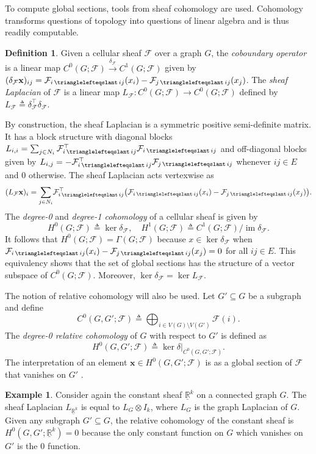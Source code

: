 \documentclass[letterpaper, 10 pt, conference]{ieeeconf}
\newcommand{\maps}{\colon}
\newcommand{\R}{\mathbb{R}}
\newcommand{\define}[1]{\emph{#1}}
\newcommand{\FF}{\mathcal{F}}
\DeclareMathOperator{\face}{\trianglelefteqslant}
\DeclareMathOperator{\image}{im}
\theoremstyle{definition}
\newtheorem{definition}{Definition}
\newtheorem{example}{Example}
\begin{document}
To compute global sections, tools from sheaf cohomology are used. Cohomology transforms questions of topology into questions of linear algebra and is thus readily computable.
\begin{definition}
    Given a cellular sheaf $\FF$ over a graph $G$, the \define{coboundary operator} is a linear map
$C^0(G; \mathcal{F}) \xrightarrow{\delta_{\mathcal{F}}} C^1(G; \mathcal{F})$ given by $(\delta_{\mathcal{F}} \mathbf{x})_{ij} = \mathcal{F}_{i \face ij}(x_i) - \mathcal{F}_{j \face ij}(x_j)$. The \define{sheaf Laplacian} of $\FF$ is a linear map $L_\FF\maps C^0(G;\FF)\to C^0(G;\FF)$ defined by $L_\FF\triangleq \delta_\FF^\top\delta_\FF$.
\end{definition}
By construction, the sheaf Laplacian is a symmetric positive semi-definite matrix. It has a block structure with diagonal blocks $L_{i,i}=\sum_{j\in N_i}\FF^\top_{i\face ij}\FF_{i\face ij}$ and off-diagonal blocks given by $L_{i,j} = -\FF^\top_{i\face ij}\FF_{j\face ij}$ whenever $ij\in E$ and $0$ otherwise. The sheaf Laplacian acts vertexwise as
\[
(L_\mathcal{F} \mathbf{x})_i = \underset{j\in N_i}{\sum} \mathcal{F}_{i \face ij}^\top  \bigl( \mathcal{F}_{i \face ij}(x_i) - \mathcal{F}_{j \face ij}(x_j) \bigr).
\]
The \define{degree-0} and \define{degree-1 cohomology} of a cellular sheaf is given by 
\[
H^0(G; \mathcal{F}) \triangleq \ker \delta_{\mathcal{F}}, \quad H^1(G; \mathcal{F}) \triangleq C^1(G; \mathcal{F})/ \image \delta_{\mathcal{F}}.
\]
It follows that $H^0(G; \mathcal{F})= \Gamma(G; \mathcal{F})$ because $x \in \ker \delta_{\mathcal{F}}$ when $\mathcal{F}_{i \face ij}(x_i) - \mathcal{F}_{j \face ij}(x_j) = 0$ for all $ij \in E$. This equivalency shows that the set of global sections has the structure of a vector subspace of $C^0(G;\FF)$. Moreover, $\ker \delta_\FF = \ker L_\FF$.

The notion of relative cohomology will also be used. Let $G'\subseteq G$ be a subgraph and define
\[
C^0(G,G';\FF)\triangleq \bigoplus_{i\in V(G)\setminus V(G')}\FF(i).
\]
The \define{degree-0 relative cohomology} of $G$ with respect to $G'$ is defined as
\[
H^0(G,G';\FF)\triangleq \ker \delta|_{C^0(G,G';\FF)}.
\]
The interpretation of an element $\mathbf{x}\in H^0(G,G';\FF)$ is as a global section of $\FF$ that vanishes on $G'$ \cite{Hansen.Jakob2021}.

\begin{example}
    Consider again the constant sheaf $\underline{\R}^k$ on a connected graph $G$. The sheaf Laplacian $L_{\underline{\R}^k}$ is equal to $L_G\otimes I_k$, where $L_G$ is the graph Laplacian of $G$. Given any subgraph $G'\subseteq G$, the relative cohomology of the constant sheaf is
    $H^0(G,G';\underline{\R}^k) = 0$
    because the only constant function on $G$ which vanishes on $G'$ is the 0 function.
\end{example}
\end{document}
